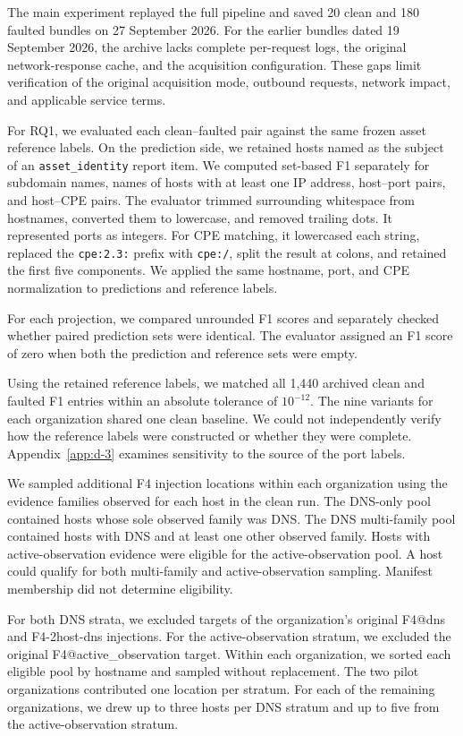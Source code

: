 \documentclass[sn-basic]{sn-jnl}%
\theoremstyle{thmstyleone}%
\theoremstyle{thmstyletwo}%
\theoremstyle{thmstylethree}%
\begin{document}
The main experiment replayed the full pipeline and saved 20 clean and 180 faulted bundles on 27 September 2026. For the earlier bundles dated 19 September 2026, the archive lacks complete per-request logs, the original network-response cache, and the acquisition configuration. These gaps limit verification of the original acquisition mode, outbound requests, network impact, and applicable service terms.

For RQ1, we evaluated each clean--faulted pair against the same frozen asset reference labels. On the prediction side, we retained hosts named as the subject of an \texttt{asset\_identity} report item. We computed set-based F1 separately for subdomain names, names of hosts with at least one IP address, host--port pairs, and host--CPE pairs. The evaluator trimmed surrounding whitespace from hostnames, converted them to lowercase, and removed trailing dots. It represented ports as integers. For CPE matching, it lowercased each string, replaced the \texttt{cpe:2.3:} prefix with \texttt{cpe:/}, split the result at colons, and retained the first five components. We applied the same hostname, port, and CPE normalization to predictions and reference labels.

For each projection, we compared unrounded F1 scores and separately checked whether paired prediction sets were identical. The evaluator assigned an F1 score of zero when both the prediction and reference sets were empty.

Using the retained reference labels, we matched all 1,440 archived clean and faulted F1 entries within an absolute tolerance of \(10^{-12}\). The nine variants for each organization shared one clean baseline. We could not independently verify how the reference labels were constructed or whether they were complete. Appendix~\ref{app:d-3} examines sensitivity to the source of the port labels.

We sampled additional F4 injection locations within each organization using the evidence families observed for each host in the clean run. The DNS-only pool contained hosts whose sole observed family was DNS. The DNS multi-family pool contained hosts with DNS and at least one other observed family. Hosts with active-observation evidence were eligible for the active-observation pool. A host could qualify for both multi-family and active-observation sampling. Manifest membership did not determine eligibility.

For both DNS strata, we excluded targets of the organization's original F4@dns and F4-2host-dns injections. For the active-observation stratum, we excluded the original F4@active\_observation target. Within each organization, we sorted each eligible pool by hostname and sampled without replacement. The two pilot organizations contributed one location per stratum. For each of the remaining organizations, we drew up to three hosts per DNS stratum and up to five from the active-observation stratum.
\end{document}
